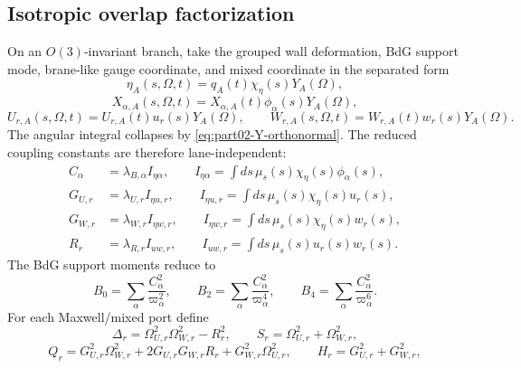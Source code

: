 \subsection{Isotropic overlap factorization}
\label{subsec:part02-isotropic-overlap-factorization}

On an \(O(3)\)-invariant branch, take the grouped wall deformation, BdG support mode, brane-like gauge coordinate, and mixed coordinate in the separated form
\begin{equation}
\eta_A(s,\Omega,t)=q_A(t)\chi_\eta(s)Y_A(\Omega),
\end{equation}
\begin{equation}
X_{\alpha,A}(s,\Omega,t)=X_{\alpha,A}(t)\phi_\alpha(s)Y_A(\Omega),
\end{equation}
\begin{equation}
U_{r,A}(s,\Omega,t)=U_{r,A}(t)u_r(s)Y_A(\Omega),
\qquad
W_{r,A}(s,\Omega,t)=W_{r,A}(t)w_r(s)Y_A(\Omega).
\end{equation}
The angular integral collapses by \eqref{eq:part02-Y-orthonormal}.  The reduced coupling constants are therefore lane-independent:
\begin{equation}
\label{eq:part02-isotropic-couplings}
\boxed{
\begin{aligned}
C_\alpha&=\lambda_{B,\alpha}I_{\eta\alpha},\qquad
I_{\eta\alpha}=\int ds\,\mu_s(s)\chi_\eta(s)\phi_\alpha(s),\\
G_{U,r}&=\lambda_{U,r}I_{\eta u,r},\qquad
I_{\eta u,r}=\int ds\,\mu_s(s)\chi_\eta(s)u_r(s),\\
G_{W,r}&=\lambda_{W,r}I_{\eta w,r},\qquad
I_{\eta w,r}=\int ds\,\mu_s(s)\chi_\eta(s)w_r(s),\\
R_r&=\lambda_{R,r}I_{uw,r},\qquad
I_{uw,r}=\int ds\,\mu_s(s)u_r(s)w_r(s).
\end{aligned}
}
\end{equation}
The BdG support moments reduce to
\begin{equation}
\label{eq:part02-Bn-isotropic}
\boxed{
B_0=\sum_\alpha\frac{C_\alpha^2}{\varpi_\alpha^2},
\qquad
B_2=\sum_\alpha\frac{C_\alpha^2}{\varpi_\alpha^4},
\qquad
B_4=\sum_\alpha\frac{C_\alpha^2}{\varpi_\alpha^6}}.
\end{equation}
For each Maxwell/mixed port define
\begin{equation}
\Delta_r=\Omega_{U,r}^2\Omega_{W,r}^2-R_r^2,
\qquad
S_r=\Omega_{U,r}^2+\Omega_{W,r}^2,
\end{equation}
\begin{equation}
Q_r=G_{U,r}^2\Omega_{W,r}^2+2G_{U,r}G_{W,r}R_r+G_{W,r}^2\Omega_{U,r}^2,
\qquad
H_r=G_{U,r}^2+G_{W,r}^2,
\end{equation}

